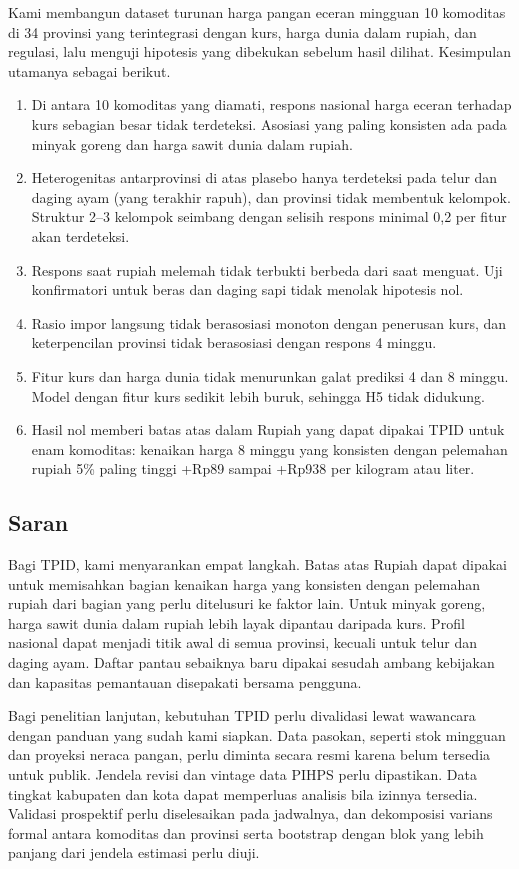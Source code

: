 \documentclass[11pt,a4paper]{article}
\begin{document}
Kami membangun dataset turunan harga pangan eceran mingguan 10 komoditas di 34 provinsi yang terintegrasi dengan kurs, harga dunia
dalam rupiah, dan regulasi, lalu menguji hipotesis yang dibekukan sebelum hasil dilihat. Kesimpulan utamanya sebagai berikut.
\begin{enumerate}
\item Di antara 10 komoditas yang diamati, respons nasional harga eceran terhadap kurs sebagian besar tidak terdeteksi. Asosiasi
yang paling konsisten ada pada minyak goreng dan harga sawit dunia dalam rupiah.
\item Heterogenitas antarprovinsi di atas plasebo hanya terdeteksi pada telur dan daging ayam (yang terakhir rapuh), dan provinsi
tidak membentuk kelompok. Struktur 2–3 kelompok seimbang dengan selisih respons minimal 0,2 per fitur akan terdeteksi.
\item Respons saat rupiah melemah tidak terbukti berbeda dari saat menguat. Uji konfirmatori untuk beras dan daging sapi tidak
menolak hipotesis nol.
\item Rasio impor langsung tidak berasosiasi monoton dengan penerusan kurs, dan keterpencilan provinsi tidak berasosiasi dengan
respons 4 minggu.
\item Fitur kurs dan harga dunia tidak menurunkan galat prediksi 4 dan 8 minggu. Model dengan fitur kurs sedikit lebih buruk,
sehingga H5 tidak didukung.
\item Hasil nol memberi batas atas dalam Rupiah yang dapat dipakai TPID untuk enam komoditas: kenaikan harga 8 minggu yang konsisten
dengan pelemahan rupiah 5\% paling tinggi +Rp89 sampai +Rp938 per kilogram atau liter.
\end{enumerate}

\subsection{Saran}

Bagi TPID, kami menyarankan empat langkah. Batas atas Rupiah dapat dipakai untuk memisahkan bagian kenaikan harga yang konsisten
dengan pelemahan rupiah dari bagian yang perlu ditelusuri ke faktor lain. Untuk minyak goreng, harga sawit dunia dalam rupiah lebih
layak dipantau daripada kurs. Profil nasional dapat menjadi titik awal di semua provinsi, kecuali untuk telur dan daging ayam.
Daftar pantau sebaiknya baru dipakai sesudah ambang kebijakan dan kapasitas pemantauan disepakati bersama pengguna.

Bagi penelitian lanjutan, kebutuhan TPID perlu divalidasi lewat wawancara dengan panduan yang sudah kami siapkan. Data pasokan,
seperti stok mingguan dan proyeksi neraca pangan, perlu diminta secara resmi karena belum tersedia untuk publik. Jendela revisi dan
vintage data PIHPS perlu dipastikan. Data tingkat kabupaten dan kota dapat memperluas analisis bila izinnya tersedia. Validasi
prospektif perlu diselesaikan pada jadwalnya, dan dekomposisi varians formal antara komoditas dan provinsi serta bootstrap dengan blok
yang lebih panjang dari jendela estimasi perlu diuji.
\end{document}
